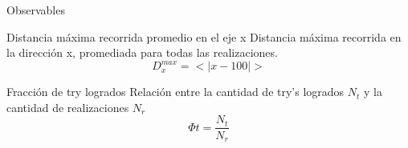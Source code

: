 \begin{frame}{Observables}
    \begin{block}{Distancia máxima recorrida promedio en el eje x}
        Distancia máxima recorrida en la dirección x, promediada para todas las realizaciones.
        \begin{equation*}
            D_{x}^{max} = <|x - 100|>
        \end{equation*}
    \end{block}
    \begin{block}{Fracción de try logrados}
        Relación entre la cantidad de try's logrados $N_t$ y la cantidad de realizaciones $N_r$
        \begin{equation*}
            \Phi t = \frac{N_t}{N_r}
        \end{equation*}
    \end{block}
\end{frame}